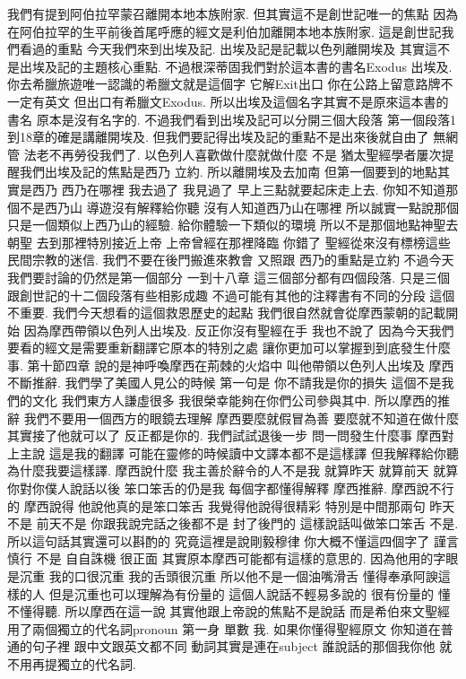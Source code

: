 \documentclass{book}
\begin{document}
我們有提到阿伯拉罕蒙召離開本地本族附家.
但其實這不是創世記唯一的焦點 因為在阿伯拉罕的生平前後首尾呼應的經文是利伯加離開本地本族附家.
這是創世記我們看過的重點 今天我們來到出埃及記.
出埃及記是記載以色列離開埃及 其實這不是出埃及記的主題核心重點.
不過根深蒂固我們對於這本書的書名Exodus 出埃及.
你去希臘旅遊唯一認識的希臘文就是這個字 它解Exit出口 你在公路上留意路牌不一定有英文 但出口有希臘文Exodus.
所以出埃及這個名字其實不是原來這本書的書名 原本是沒有名字的.
不過我們看到出埃及記可以分開三個大段落 第一個段落1到18章的確是講離開埃及.
但我們要記得出埃及記的重點不是出來後就自由了 無網管 法老不再勞役我們了.
以色列人喜歡做什麼就做什麼 不是 猶太聖經學者屢次提醒我們出埃及記的焦點是西乃 立約.
所以離開埃及去加南 但第一個要到的地點其實是西乃 西乃在哪裡 我去過了 我見過了 早上三點就要起床走上去.
你知不知道那個不是西乃山 導遊沒有解釋給你聽 沒有人知道西乃山在哪裡 所以誠實一點說那個只是一個類似上西乃山的經驗.
給你體驗一下類似的環境 所以不是那個地點神聖去朝聖 去到那裡特別接近上帝 上帝曾經在那裡降臨 你錯了 聖經從來沒有標榜這些民間宗教的迷信.
我們不要在後門搬進來教會 又照跟 西乃的重點是立約 不過今天我們要討論的仍然是第一個部分 一到十八章 這三個部分都有四個段落.
只是三個 跟創世記的十二個段落有些相影成趣 不過可能有其他的注釋書有不同的分段 這個不重要.
我們今天想看的這個救恩歷史的起點 我們很自然就會從摩西蒙朝的記載開始 因為摩西帶領以色列人出埃及.
反正你沒有聖經在手 我也不說了 因為今天我們要看的經文是需要重新翻譯它原本的特別之處 讓你更加可以掌握到到底發生什麼事.
第十節四章 說的是神呼喚摩西在荊棘的火焰中 叫他帶領以色列人出埃及 摩西不斷推辭.
我們學了美國人見公的時候 第一句是 你不請我是你的損失 這個不是我們的文化 我們東方人謙虛很多 我很榮幸能夠在你們公司參與其中.
所以摩西的推辭 我們不要用一個西方的眼鏡去理解 摩西要麼就假冒為善 要麼就不知道在做什麼 其實接了他就可以了 反正都是你的.
我們試試退後一步 問一問發生什麼事 摩西對上主說 這是我的翻譯 可能在靈修的時候讀中文譯本都不是這樣譯 但我解釋給你聽為什麼我要這樣譯.
摩西說什麼 我主善於辭令的人不是我 就算昨天 就算前天 就算你對你僕人說話以後 笨口笨舌的仍是我 每個字都懂得解釋 摩西推辭.
摩西說不行的 摩西說得 他說他真的是笨口笨舌 我覺得他說得很精彩 特別是中間那兩句 昨天不是 前天不是 你跟我說完話之後都不是 封了後門的 這樣說話叫做笨口笨舌 不是.
所以這句話其實還可以斟酌的 究竟這裡是說剛毅穆律 你大概不懂這四個字了 謹言慎行 不是 自自誅機 很正面 其實原本摩西可能都有這樣的意思的.
因為他用的字眼是沉重 我的口很沉重 我的舌頭很沉重 所以他不是一個油嘴滑舌 懂得奉承阿諛這樣的人 但是沉重也可以理解為有份量的 這個人說話不輕易多說的 很有份量的 懂不懂得聽.
所以摩西在這一說 其實他跟上帝說的焦點不是說話 而是希伯來文聖經用了兩個獨立的代名詞pronoun 第一身 單數 我.
如果你懂得聖經原文 你知道在普通的句子裡 跟中文跟英文都不同 動詞其實是連在subject 誰說話的那個我你他 就不用再提獨立的代名詞.
\end{document}
